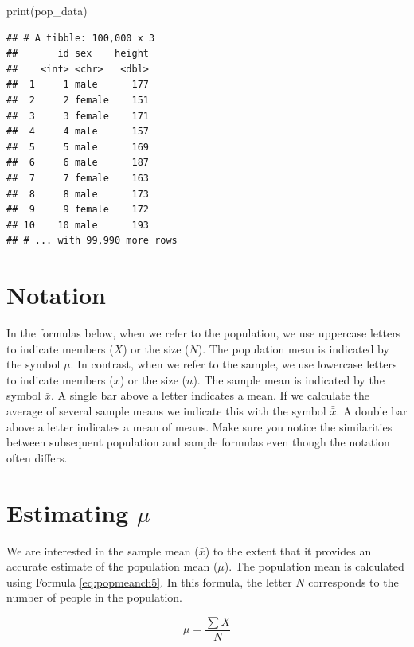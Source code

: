 \documentclass[
]{krantz}
\makeatletter
\newenvironment{Shaded}{\begin{snugshade}}{\end{snugshade}}
\newcommand{\FunctionTok}[1]{\textcolor[rgb]{0,0,0}{#1}}
\newcommand{\NormalTok}[1]{#1}
\newenvironment{kframe}{%
\medskip{}
\setlength{\fboxsep}{.8em}
 \def\at@end@of@kframe{}%
 \ifinner\ifhmode%
  \def\at@end@of@kframe{\end{minipage}}%
  \begin{minipage}{\columnwidth}%
 \fi\fi%
 \def\FrameCommand##1{\hskip\@totalleftmargin \hskip-\fboxsep
 \colorbox{shadecolor}{##1}\hskip-\fboxsep
     \hskip-\linewidth \hskip-\@totalleftmargin \hskip\columnwidth}%
 \MakeFramed {\advance\hsize-\width
   \@totalleftmargin\z@ \linewidth\hsize
   \@setminipage}}%
 {\par\unskip\endMakeFramed%
 \at@end@of@kframe}
\renewenvironment{Shaded}{\begin{kframe}}{\end{kframe}}
\makeatother
\begin{document}
\begin{Shaded}
\begin{Highlighting}[]
\FunctionTok{print}\NormalTok{(pop\_data)}
\end{Highlighting}
\end{Shaded}

\begin{verbatim}
## # A tibble: 100,000 x 3
##       id sex    height
##    <int> <chr>   <dbl>
##  1     1 male      177
##  2     2 female    151
##  3     3 female    171
##  4     4 male      157
##  5     5 male      169
##  6     6 male      187
##  7     7 female    163
##  8     8 male      173
##  9     9 female    172
## 10    10 male      193
## # ... with 99,990 more rows
\end{verbatim}

\hypertarget{notation-1}{%
\section{Notation}\label{notation-1}}

In the formulas below, when we refer to the population, we use uppercase letters to indicate members (\(X\)) or the size (\(N\)). The population mean is indicated by the symbol \(\mu\). In contrast, when we refer to the sample, we use lowercase letters to indicate members (\(x\)) or the size (\(n\)). The sample mean is indicated by the symbol \(\bar{x}\). A single bar above a letter indicates a mean. If we calculate the average of several sample means we indicate this with the symbol \(\bar{\bar{x}}\). A double bar above a letter indicates a mean of means. Make sure you notice the similarities between subsequent population and sample formulas even though the notation often differs.

\hypertarget{estimating-mu}{%
\section{\texorpdfstring{Estimating \(\mu\)}{Estimating \textbackslash mu}}\label{estimating-mu}}

We are interested in the sample mean (\(\bar{x}\)) to the extent that it provides an accurate estimate of the population mean (\(\mu\)). The population mean is calculated using Formula \eqref{eq:popmeanch5}. In this formula, the letter \(N\) corresponds to the number of people in the population.

\begin{equation} 
\mu = \frac{\sum{X}}{N}
      \label{eq:popmeanch5}
\end{equation}
\end{document}
